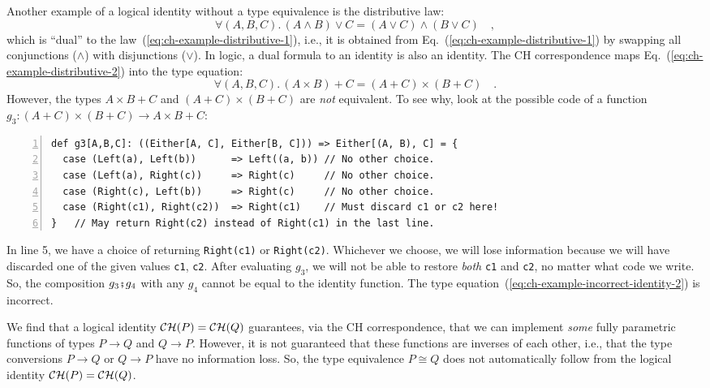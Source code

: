 Another example of a logical identity without a type equivalence is
the distributive law:
\begin{equation}
\forall(A,B,C).\,\left(A\wedge B\right)\vee C=\left(A\vee C\right)\wedge\left(B\vee C\right)\quad,\label{eq:ch-example-distributive-2}
\end{equation}
which is \textsf{``}dual\textsf{''} to the law~(\ref{eq:ch-example-distributive-1}),
i.e., it is obtained from Eq.~(\ref{eq:ch-example-distributive-1})
by swapping all conjunctions ($\wedge$) with disjunctions ($\vee$).
In logic, a dual formula to an identity is also an identity. The CH
correspondence maps Eq.~(\ref{eq:ch-example-distributive-2}) into
the type equation:
\begin{equation}
\forall(A,B,C).\,\left(A\times B\right)+C=\left(A+C\right)\times\left(B+C\right)\quad.\label{eq:ch-example-incorrect-identity-2}
\end{equation}
However, the types $A\times B+C$ and $\left(A+C\right)\times\left(B+C\right)$
are \emph{not} equivalent. To see why, look at the possible code of
a function $g_{3}:\left(A+C\right)\times\left(B+C\right)\rightarrow A\times B+C$:
\begin{lstlisting}[numbers=left]
def g3[A,B,C]: ((Either[A, C], Either[B, C])) => Either[(A, B), C] = {
  case (Left(a), Left(b))      => Left((a, b)) // No other choice.
  case (Left(a), Right(c))     => Right(c)     // No other choice.
  case (Right(c), Left(b))     => Right(c)     // No other choice.
  case (Right(c1), Right(c2))  => Right(c1)    // Must discard c1 or c2 here!
}   // May return Right(c2) instead of Right(c1) in the last line.
\end{lstlisting}
In line 5, we have a choice of returning \lstinline!Right(c1)! or
\lstinline!Right(c2)!. Whichever we choose, we will lose information
because we will have discarded one of the given values \lstinline!c1!,
\lstinline!c2!. After evaluating $g_{3}$, we will not be able to
restore \emph{both} \lstinline!c1! and \lstinline!c2!, no matter
what code we write. So, the composition $g_{3}\bef g_{4}$ with any
$g_{4}$ cannot be equal to the identity function. The type equation~(\ref{eq:ch-example-incorrect-identity-2})
is incorrect.

We find that a logical identity ${\cal CH}(P)={\cal CH}(Q)$ guarantees,
via the CH correspondence, that we can implement \emph{some} fully
parametric functions of types $P\rightarrow Q$ and $Q\rightarrow P$.
However, it is not guaranteed that these functions are inverses of
each other, i.e., that the type conversions $P\rightarrow Q$ or $Q\rightarrow P$
have no information loss. So, the type equivalence
$P\cong Q$ does not automatically follow from the logical identity
${\cal CH}(P)={\cal CH}(Q)$.

